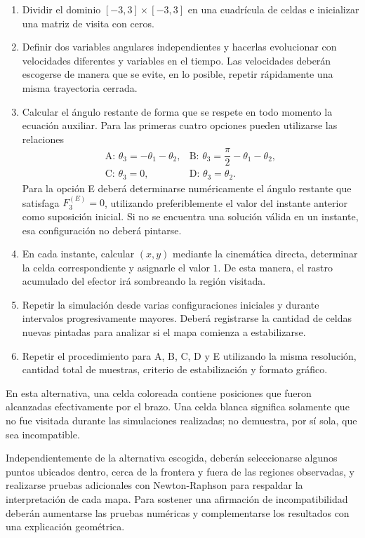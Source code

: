 \documentclass[12pt]{article}
\begin{document}
\begin{enumerate}[label=\arabic*.]
    \item Dividir el dominio \([-3,3]\times[-3,3]\) en una cuadrícula de celdas e inicializar una matriz de visita con ceros.
    \item Definir dos variables angulares independientes y hacerlas evolucionar con velocidades diferentes y variables en el tiempo. Las velocidades deberán escogerse de manera que se evite, en lo posible, repetir rápidamente una misma trayectoria cerrada.
    \item Calcular el ángulo restante de forma que se respete en todo momento la ecuación auxiliar. Para las primeras cuatro opciones pueden utilizarse las relaciones
    \[
    \begin{array}{ll}
    \text{A: }\theta_3=-\theta_1-\theta_2,
    &\text{B: }\theta_3=\dfrac{\pi}{2}-\theta_1-\theta_2,\\[0.5em]
    \text{C: }\theta_3=0,
    &\text{D: }\theta_3=\theta_2.
    \end{array}
    \]
    Para la opción E deberá determinarse numéricamente el ángulo restante que satisfaga \(F_3^{(E)}=0\), utilizando preferiblemente el valor del instante anterior como suposición inicial. Si no se encuentra una solución válida en un instante, esa configuración no deberá pintarse.
    \item En cada instante, calcular \((x,y)\) mediante la cinemática directa, determinar la celda correspondiente y asignarle el valor \(1\). De esta manera, el rastro acumulado del efector irá sombreando la región visitada.
    \item Repetir la simulación desde varias configuraciones iniciales y durante intervalos progresivamente mayores. Deberá registrarse la cantidad de celdas nuevas pintadas para analizar si el mapa comienza a estabilizarse.
    \item Repetir el procedimiento para A, B, C, D y E utilizando la misma resolución, cantidad total de muestras, criterio de estabilización y formato gráfico.
\end{enumerate}

En esta alternativa, una celda coloreada contiene posiciones que fueron alcanzadas efectivamente por el brazo. Una celda blanca significa solamente que no fue visitada durante las simulaciones realizadas; no demuestra, por sí sola, que sea incompatible.

Independientemente de la alternativa escogida, deberán seleccionarse algunos puntos ubicados dentro, cerca de la frontera y fuera de las regiones observadas, y realizarse pruebas adicionales con Newton-Raphson para respaldar la interpretación de cada mapa. Para sostener una afirmación de incompatibilidad deberán aumentarse las pruebas numéricas y complementarse los resultados con una explicación geométrica.
\end{document}

